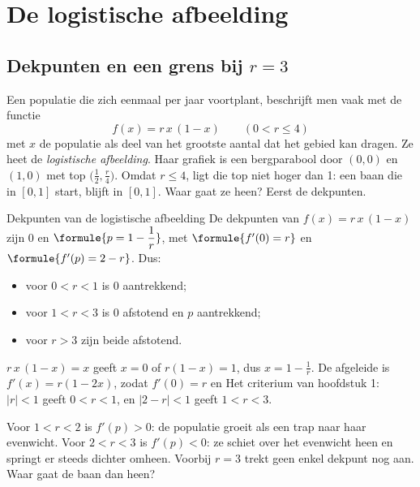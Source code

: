 \section{De logistische afbeelding}

\subsection{Dekpunten en een grens bij \texorpdfstring{$r = 3$}{r = 3}}

Een populatie die zich eenmaal per jaar voortplant, beschrijft men vaak met de functie
\[
f(x) = r\,x\,(1 - x) \qquad (0 < r \leqslant 4)
\]
met $x$ de populatie als deel van het grootste aantal dat het gebied kan dragen. Ze heet de \emph{logistische afbeelding}. Haar grafiek is een bergparabool door $(0, 0)$ en $(1, 0)$ met top $\bigl(\tfrac12, \tfrac r4\bigr)$. Omdat $r \leqslant 4$, ligt die top niet hoger dan 1: een baan die in $[0, 1]$ start, blijft in $[0, 1]$. Waar gaat ze heen? Eerst de dekpunten.

\begin{theorie}
\begin{stelling}{Dekpunten van de logistische afbeelding}
De dekpunten van $f(x) = r\,x\,(1 - x)$ zijn $0$ en $\formule{p = 1 - \dfrac1r}$, met $\formule{f'(0) = r}$ en $\formule{f'(p) = 2 - r}$. Dus:
\begin{itemize}
\item voor $0 < r < 1$ is 0 aantrekkend;
\item voor $1 < r < 3$ is 0 afstotend en $p$ aantrekkend;
\item voor $r > 3$ zijn beide afstotend.
\end{itemize}
\end{stelling}

\begin{bewijs}
$r\,x\,(1 - x) = x$ geeft $x = 0$ of $r(1 - x) = 1$, dus $x = 1 - \tfrac1r$. De afgeleide is $f'(x) = r(1 - 2x)$, zodat $f'(0) = r$ en
Het criterium van hoofdstuk 1: $|r| < 1$ geeft $0 < r < 1$, en $|2 - r| < 1$ geeft $1 < r < 3$.
\end{bewijs}
\end{theorie}

Voor $1 < r < 2$ is $f'(p) > 0$: de populatie groeit als een trap naar haar evenwicht. Voor $2 < r < 3$ is $f'(p) < 0$: ze schiet over het evenwicht heen en springt er steeds dichter omheen. Voorbij $r = 3$ trekt geen enkel dekpunt nog aan. Waar gaat de baan dan heen?

